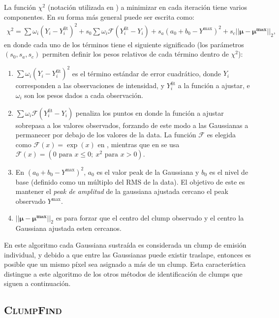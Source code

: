 \documentclass[letter, 11pt]{article}
\begin{document}
La función $\chi^2$ (notación utilizada en \cite{Stutzki}) a minimizar en cada iteración tiene varios componentes. En su forma más general puede ser escrita como:
\begin{align}
    \chi^2 = \sum \omega_i (Y_i - Y_i^{\text{fit}})^2 + s_0 \sum \omega_i \mathcal{F}(Y_i^{\text{fit}}- Y_i) + s_a (a_0 + b_0 - Y^{\text{max}})^2 + s_c ||\boldsymbol{\mu - \mu^{\text{max}}}||_2,
\end{align}
en donde cada uno de los términos tiene el siguiente significado (los parámetros $(s_0, s_a, s_c)$ permiten definir los pesos relativos de cada término dentro de $\chi^2$):
\begin{enumerate}
    \item $\displaystyle \sum \omega_i (Y_i - Y_i^{\text{fit}})^2$ es el término estándar de error cuadrático, donde $Y_i$ corresponden a las observaciones de intensidad, y $Y_i^{\text{fit}}$ a la función a ajustar, e $\omega_i$ son los pesos dados a cada observación.
    \item $\displaystyle \sum \omega_i \mathcal{F}(Y_i^{\text{fit}}-Y_i)$ penaliza los puntos en donde la función a ajustar sobrepasa a los valores observados, forzando de este modo a las Gaussianas a permanecer por debajo de los valores de la data. La función $\mathcal{F}$ es elegida como $\mathcal{F}(x)=\exp(x)$ en \cite{Stutzki}, mientras que en \cite{Kramer} se usa $\mathcal{F}(x) = (0 \text{ para } x\leq 0; \ x^2 \text{ para } x>0)$.
    \item En $(a_0 + b_0 - Y^{\text{max}})^2$, $a_0$ es el valor peak de la Gaussiana y $b_0$ es el nivel de base (definido como un múltiplo del RMS de la data). El objetivo de este es mantener el \textit{peak de amplitud} de la gaussiana ajustada cercano el peak observado $Y^{\text{max}}$.
    \item $||\boldsymbol{\mu - \mu^{\text{max}}}||_2$ es para forzar que el centro del clump observado y el centro la Gaussiana ajustada esten cercanos.
\end{enumerate}

En este algoritmo cada Gaussiana sustraída es considerada un clump de emisión individual, y debido a que entre las Gaussianas puede existir traslape, entonces es posible que un mismo píxel sea asignado a más de un clump. Esta característica distingue a este algoritmo de los otros métodos de identificación de clumps que siguen a continuación.

\subsection{\textsc{ClumpFind}}
\end{document}
